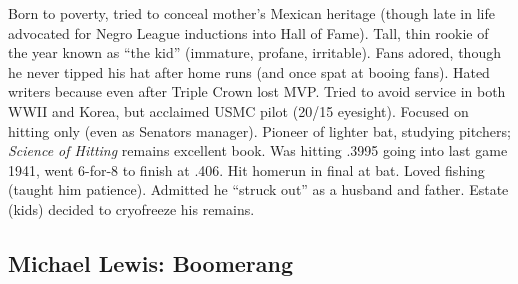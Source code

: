 \documentclass[
]{article}
\begin{document}
Born to poverty, tried to conceal mother's Mexican heritage (though late
in life advocated for Negro League inductions into Hall of Fame). Tall,
thin rookie of the year known as ``the kid'' (immature, profane,
irritable). Fans adored, though he never tipped his hat after home runs
(and once spat at booing fans). Hated writers because even after Triple
Crown lost MVP. Tried to avoid service in both WWII and Korea, but
acclaimed USMC pilot (20/15 eyesight). Focused on hitting only (even as
Senators manager). Pioneer of lighter bat, studying pitchers;
\emph{Science of Hitting} remains excellent book. Was hitting .3995
going into last game 1941, went 6-for-8 to finish at .406. Hit homerun
in final at bat. Loved fishing (taught him patience). Admitted he
``struck out'' as a husband and father. Estate (kids) decided to
cryofreeze his remains.

\hypertarget{michael-lewis-boomerang}{%
\subsection{Michael Lewis: Boomerang}\label{michael-lewis-boomerang}}
\end{document}
